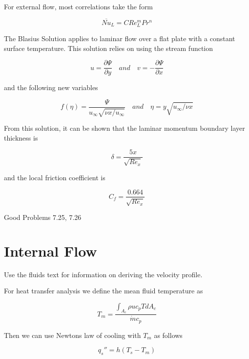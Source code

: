 \documentclass[paper=letter, fontsize=11pt]{scrartcl}
\numberwithin{equation}{section}        %
\numberwithin{figure}{section}          %
\numberwithin{table}{section}               %
\begin{document}
For external flow, most correlations take the form

\begin{equation}
\overline{Nu}_L = CRe_L^mPr^n
\end{equation}

The Blasius Solution applies to laminar flow over a flat plate with a constant surface temperature. This solution relies on using the stream function 

\begin{equation}
u = \frac{\partial\Psi}{\partial y}\quad and\quad v = -\frac{\partial\Psi}{\partial x}
\end{equation}

\noindent and the following new variables

\begin{equation}
f(\eta) = \frac{\Psi}{u_\infty\sqrt{\nu x/u_\infty}}\quad and\quad \eta = y\sqrt{u_\infty/\nu x}
\end{equation}

From this solution, it can be shown that the laminar momentum boundary layer thickness is

\begin{equation}
\delta = \frac{5x}{\sqrt{Re_x}}
\end{equation}

\noindent and the local friction coefficient is 

\begin{equation}
C_f = \frac{0.664}{\sqrt{Re_x}}
\end{equation}

\bigskip Good Problems 7.25, 7.26


\section{Internal Flow}

Use the fluids text for information on deriving the velocity profile.

For heat transfer analysis we define the mean fluid temperature as

\begin{equation}
T_m = \frac{\int_{A_c} \rho u c_p T dA_c}{\dot m c_p}
\end{equation}

Then we can use Newtons law of cooling with $T_m$ as follows

\begin{equation}
q_s'' = h(T_s - T_m)
\end{equation}
\end{document}
